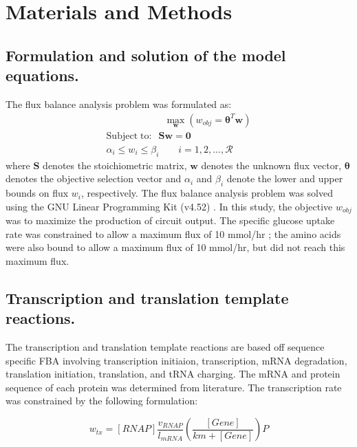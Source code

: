 \documentclass[journal=asbcd6,manuscript=article]{achemso}
\begin{document}
\section*{Materials and Methods}

\subsection*{Formulation and solution of the model equations.}
The flux balance analysis problem was formulated as:
\begin{equation}\nonumber
 \begin{multlined}
	\qquad \qquad \qquad \max_{\boldsymbol{w}}{} \! \left( w_{obj} = \mathbf{\boldsymbol{\theta}}^T \boldsymbol{w} \right) \\
	\mathrm{Subject \; to:}
	 \; \; \mathbf{S}\mathbf{w}=\mathbf{0} \\
\alpha_i \leq w_i \leq \beta_i  \qquad i=1,2,\hdots,\mathcal{R}
 \end{multlined}
\end{equation}
where $\mathbf{S}$ denotes the stoichiometric matrix, $\mathbf{w}$ denotes the unknown flux vector, $\boldsymbol{\theta}$ denotes the objective selection vector
and $\alpha_i$ and $\beta_i$ denote the lower and upper bounds on flux $w_{i}$, respectively.
The flux balance analysis problem was solved using the GNU Linear Programming Kit (v4.52) \cite{GLPK}.
In this study, the objective $w_{obj}$ was to maximize the production of circuit output.
The specific glucose uptake rate was constrained to allow a maximum flux of 10 mmol/hr \cite{2002_Mahadevan_BiophysJ}; the amino acids were also bound to allow a maximum flux of 10 mmol/hr, but did not reach this maximum flux.

\subsection*{Transcription and translation template reactions.}
The transcription and translation template reactions are based off sequence specific FBA \cite{2002_allen_palsson} involving transcription initiaion, transcription, mRNA degradation, translation initiation, translation, and tRNA charging. 
The mRNA and protein sequence of each protein was determined from literature. 
The transcription rate was constrained by the following formulation:

\begin{equation}\nonumber
	w_{tx} = [RNAP]\frac{v_{RNAP}}{l_{mRNA}}\left(\frac{[Gene]}{km+[Gene]}\right)P
\end{equation}
\end{document}
